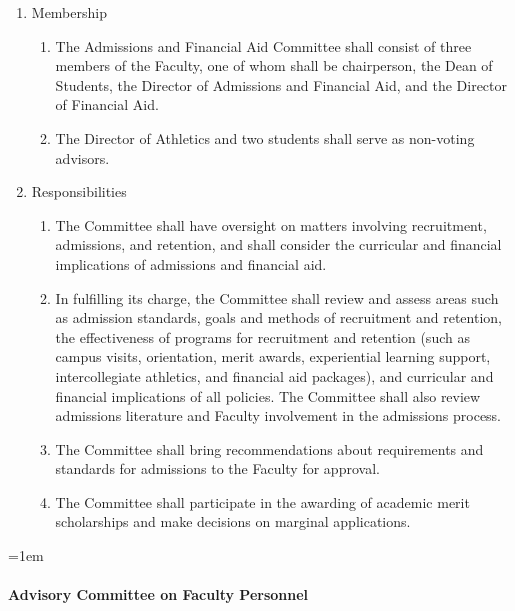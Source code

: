 \documentclass{manual}
\let\oldparagraph\paragraph
\renewcommand\paragraph{\leftskip=1em\oldparagraph}
\newcommand{\itemLevelA}{\alph*.}
\newcommand{\itemLevelB}{\arabic*)}
\newcommand{\itemRefA}{\alph*}
\newcommand{\itemRefB}{\arabic*}
\begin{document}
\begin{enumerate}[label=\itemLevelA,ref=\itemRefA]
\item Membership
\begin{enumerate}[label=\itemLevelB,ref=\itemRefB]
\item The Admissions and Financial Aid Committee shall consist of three members of the Faculty, one of whom shall be chairperson, the Dean of Students, the Director of Admissions and Financial Aid, and the Director of Financial Aid.
\item The Director of Athletics and two students shall serve as non-voting advisors.
\end{enumerate}
\item Responsibilities
\begin{enumerate}[label=\itemLevelB,ref=\itemRefB]
\item The Committee shall have oversight on matters involving recruitment, admissions, and retention, and shall consider the curricular and financial implications of admissions and financial aid.
\item In fulfilling its charge, the Committee shall review and assess areas such as admission standards, goals and methods of recruitment and retention, the effectiveness of programs for recruitment and retention (such as campus visits, orientation, merit awards, experiential learning support, intercollegiate athletics, and financial aid packages), and curricular and financial implications of all policies. The Committee shall also review admissions literature and Faculty involvement in the admissions process.
\item The Committee shall bring recommendations about requirements and standards for admissions to the Faculty for approval.
\item The Committee shall participate in the awarding of academic merit scholarships and make decisions on marginal applications.

\end{enumerate}
\end{enumerate}

\paragraph{Advisory Committee on Faculty Personnel}\label{par:AdvisoryCommitteeOnFacultyPersonnel}
\end{document}
